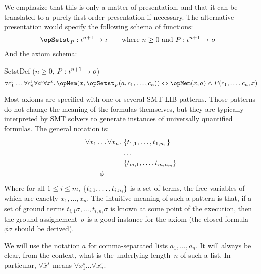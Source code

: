 \documentclass[11pt, a4paper, oneside]{article}
\begin{document}
We emphasize that this is only a matter of presentation, and that it can be translated to a purely first-order presentation if necessary.  The alternative presentation would specify the following schema of functions:
\begin{align*}
    \opSetst_P &: \idv^{n+1} \arr \idv  \qquad\text{where $n \ge 0$ and $P : \idv^{n+1} \arr o$}
\end{align*}
And the axiom schema:
\begin{axioms}
\item[SetstDef ($n \ge 0$, $P : \iota^{n+1} \rightarrow o$)] \[
        \forall c_1^\idv \dots \forall c_n^\idv \forall a^\idv \forall x^\idv.\, \opMem(x, \opSetst_P(a, c_1, \dots, c_n)) \eqv \opMem(x, a) \wedge P(c_1, \dots, c_n, x)
    \]

\end{axioms}

Most axioms are specified with one or several SMT-LIB patterns.  Those patterns do not change the meaning of the formulas themselves, but they are typically interpreted by SMT solvers to generate instances of universally quantified formulas.  The general notation is:
\[
    \begin{aligned}
        &\forall x_1 \dots \forall x_n.\, \begin{aligned}[t]
            &\left\{  t_{1,1}, \dots, t_{1,n_1}  \right\} \\
            &\dots \\
            &\left\{  t_{m,1}, \dots, t_{m,n_m}  \right\}
        \end{aligned} \\
        &\qquad \phi
    \end{aligned}
\]
Where for all $1 \le i \le m$, $\left\{  t_{i,1}, \dots, t_{i,n_i}  \right\}$ is a set of terms, the free variables of which are exactly $x_1,\dots,x_n$.  The intuitive meaning of such a pattern is that, if a set of ground terms $t_{i,1}\sigma, \dots, t_{i,n_i}\sigma$ is known at some point of the execution, then the ground assignement~$\sigma$ is a good instance for the axiom (the closed formula~$\phi\sigma$ should be derived).

We will use the notation $\overline{a}$ for comma-separated lists $a_1,\dots,a_n$.  It will always be clear, from the context, what is the underlying length~$n$ of such a list.  In particular, $\forall \overline{x}^s$ means $\forall x_1^s \dots \forall x_n^s$.
\end{document}
